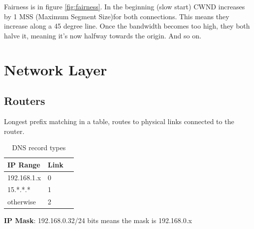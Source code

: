 \documentclass{article}
\begin{document}
Fairness is in figure \ref{fig:fairness}. In the beginning (slow start) CWND increases by 1 MSS (Maximum Segment Size)for both connections. This means they increase along a 45 degree line. Once the bandwidth becomes too high, they both halve it, meaning it's now halfway towards the origin. And so on.

\section{Network Layer}
\subsection{Routers}
Longest prefix matching in a table, routes to physical links connected to the router. 
\begin{table}[h]
    \centering
    \begin{tabular}{ lll }
        IP Range & Link \\
        \hline
        192.168.1.x & 0 \\
        15.*.*.* & 1 \\
        otherwise & 2
    \end{tabular}
    \caption{DNS record types}
    \label{tab:router}
\end{table}

\textbf{IP Mask}: 192.168.0.32/24 bits means the mask is 192.168.0.x
\end{document}
